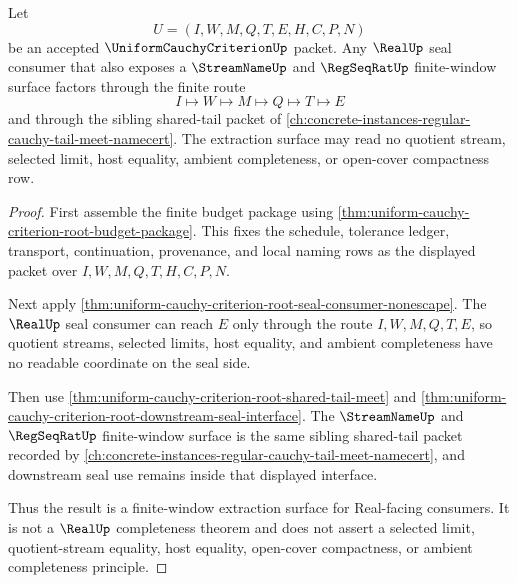 \begin{theorem}
\label{thm:uniform-cauchy-criterion-root-finite-window-real-seal-extraction}
Let
$$
U=(I,W,M,Q,T,E,H,C,P,N)
$$
be an accepted $\UniformCauchyCriterionUp$ packet. Any $\RealUp$ seal consumer that also exposes a $\StreamNameUp$ and $\RegSeqRatUp$ finite-window surface factors through the finite route
$$
I \longmapsto W \longmapsto M \longmapsto Q \longmapsto T \longmapsto E
$$
and through the sibling shared-tail packet of \autoref{ch:concrete-instances-regular-cauchy-tail-meet-namecert}. The extraction surface may read no quotient stream, selected limit, host equality, ambient completeness, or open-cover compactness row.
\end{theorem}
\begin{proof}
First assemble the finite budget package using \autoref{thm:uniform-cauchy-criterion-root-budget-package}. This fixes the schedule, tolerance ledger, transport, continuation, provenance, and local naming rows as the displayed packet over $I,W,M,Q,T,H,C,P,N$.

Next apply \autoref{thm:uniform-cauchy-criterion-root-seal-consumer-nonescape}. The $\RealUp$ seal consumer can reach $E$ only through the route $I,W,M,Q,T,E$, so quotient streams, selected limits, host equality, and ambient completeness have no readable coordinate on the seal side.

Then use \autoref{thm:uniform-cauchy-criterion-root-shared-tail-meet} and \autoref{thm:uniform-cauchy-criterion-root-downstream-seal-interface}. The $\StreamNameUp$ and $\RegSeqRatUp$ finite-window surface is the same sibling shared-tail packet recorded by \autoref{ch:concrete-instances-regular-cauchy-tail-meet-namecert}, and downstream seal use remains inside that displayed interface.

Thus the result is a finite-window extraction surface for Real-facing consumers. It is not a $\RealUp$ completeness theorem and does not assert a selected limit, quotient-stream equality, host equality, open-cover compactness, or ambient completeness principle.
\end{proof}

